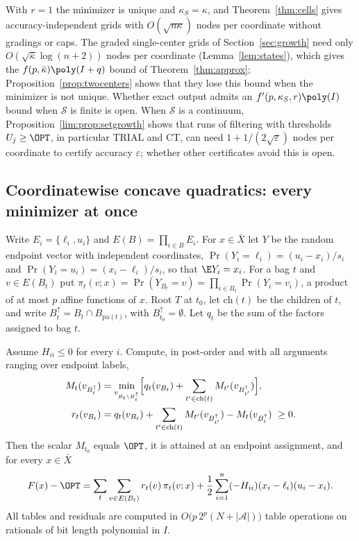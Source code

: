 \begin{remark}\label{rem:grading}
With $r=1$ the minimizer is unique and $\kappa_S=\kappa$, and
Theorem~\ref{thm:cells} gives accuracy-independent grids with
$O(\sqrt{n\kappa})$ nodes per coordinate without gradings or caps. The graded
single-center grids of Section~\ref{sec:growth} need only
$O(\sqrt{\bar\kappa}\log(n+2))$ nodes per coordinate (Lemma~\ref{lem:states}),
which gives the $f(p,\bar\kappa)\poly(I+q)$ bound of
Theorem~\ref{thm:approx}; Proposition~\ref{prop:twocenters} shows that they
lose this bound when the minimizer is not unique. Whether exact output admits
an $f'(p,\kappa_S,r)\poly(I)$ bound when $\mathcal S$ is finite is open. When
$\mathcal S$ is a continuum, Proposition~\ref{lim:prop:setgrowth} shows that
runs of filtering with thresholds $U_j\ge\OPT$, in particular TRIAL and CT,
can need $1+1/(2\sqrt\varepsilon)$ nodes per coordinate to certify accuracy
$\varepsilon$; whether other certificates avoid this is open.
\end{remark}


\subsection{Coordinatewise concave quadratics: every minimizer at once}\label{sec:endpointset}

Write $E_i=\{\ell_i,u_i\}$ and $E(B)=\prod_{i\in B}E_i$. For $x\in\bar X$ let
$Y$ be the random endpoint vector with independent coordinates,
$\Pr(Y_i=\ell_i)=(u_i-x_i)/s_i$ and $\Pr(Y_i=u_i)=(x_i-\ell_i)/s_i$, so that
$\E Y_i=x_i$. For a bag $t$ and $v\in E(B_t)$ put
$\pi_t(v;x)=\Pr(Y_{B_t}=v)=\prod_{i\in B_t}\Pr(Y_i=v_i)$, a product of at
most $p$ affine functions of $x$. Root $T$ at $t_0$,
let $\mathrm{ch}(t)$ be the children of $t$, and write
$B_t^{\uparrow}=B_t\cap B_{\mathrm{pa}(t)}$, with $B_{t_0}^{\uparrow}=\emptyset$.
Let $q_t$ be the sum of the factors assigned to bag $t$.

\begin{lemma}\label{lem:endpointid}
Assume $H_{ii}\le0$ for every $i$. Compute, in post-order and with all
arguments ranging over endpoint labels,
\begin{align*}
M_t(v_{B_t^\uparrow})&=\min_{v_{B_t\setminus B_t^\uparrow}}
\Bigl[q_t(v_{B_t})+\sum_{t'\in\mathrm{ch}(t)}M_{t'}(v_{B_{t'}^\uparrow})\Bigr],\\
r_t(v_{B_t})&=q_t(v_{B_t})+\sum_{t'\in\mathrm{ch}(t)}M_{t'}(v_{B_{t'}^\uparrow})
-M_t(v_{B_t^\uparrow})\ \ge0 .
\end{align*}
Then the scalar $M_{t_0}$ equals $\OPT$, it is attained at an endpoint
assignment, and for every $x\in\bar X$
\begin{equation}\label{eq:endpointid}
F(x)-\OPT=\sum_{t}\sum_{v\in E(B_t)}r_t(v)\,\pi_t(v;x)
+\frac12\sum_{i=1}^n(-H_{ii})(x_i-\ell_i)(u_i-x_i).
\end{equation}
All tables and residuals are computed in
$O\bigl(p\,2^p(N+|\mathcal A|)\bigr)$ table operations on rationals of
bit length polynomial in $I$.
\end{lemma}

